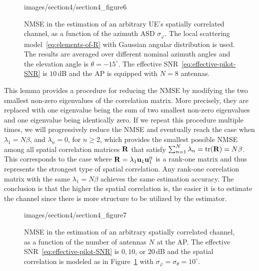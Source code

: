 \begin{figure}[t!]
	\begin{overpic}[width=\columnwidth,tics=10]{images/section4/section4_figure6}
\end{overpic} 
                \caption{NMSE in the estimation of an arbitrary UE's spatially correlated channel, as a function of the azimuth ASD $\sigma_{\varphi}$. The local scattering model~\eqref{eq:elements-of-R} with Gaussian angular distribution is used. The results are averaged over different nominal azimuth angles and the elevation angle is $\theta = -15^\circ$. The effective SNR~\eqref{eq:effective-pilot-SNR} is $10$\,dB and the AP is equipped with $N=8$ antennas.}    \vspace{+2mm}
	\label{fig:basic-NMSE-ASD-effect} 
\end{figure}


This lemma provides a procedure for reducing the NMSE by modifying the two smallest non-zero eigenvalues of the correlation matrix. More precisely, they are replaced with one eigenvalue being the sum of two smallest non-zero eigenvalues and one eigenvalue being identically zero.
If we repeat this procedure multiple times, we will progressively reduce the NMSE and eventually reach the case when $\lambda_1=N\beta$, and $\lambda_n=0$, for $n\geq 2$, which provides the smallest possible NMSE among all spatial correlation matrices $\mathbf{R}$ that satisfy $\sum_{n=1}^N\lambda_n=\mathrm{tr}( \mathbf{R} )=N\beta$.
This corresponds to the case where $\vect{R}=\lambda_1\vect{u}_1\vect{u}_1^{\Htran}$ is a rank-one matrix and thus represents the strongest type of spatial correlation.
Any rank-one correlation matrix with the same  $\lambda_1=N\beta$ achieves the same estimation accuracy. 
The conclusion is that the higher the spatial correlation is, the easier it is to estimate the channel since there is more structure to be utilized by the estimator.



\begin{figure}[t!]
	\begin{overpic}[width=\columnwidth,tics=10]{images/section4/section4_figure7}
\end{overpic} 
                \caption{NMSE in the estimation of an arbitrary spatially correlated channel, as a function of the number of antennas $N$ at the AP.
                The effective SNR~\eqref{eq:effective-pilot-SNR} is $0,10$, or $20$\,dB and the spatial correlation is modeled as in Figure~\ref{fig:basic-NMSE-ASD-effect} with $\sigma_{\varphi}=\sigma_{\theta}=10^\circ$.}    \vspace{+2mm}
	\label{fig:basic-NMSE-numOfAntennas-effect} 
\end{figure}

